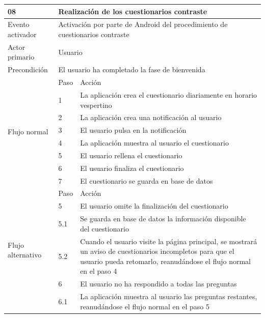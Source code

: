     \begin{table}[h]
        \centering
        \begin{tabularx}{\textwidth}{|l|l|X|}
            \hline
            08 & \multicolumn{2}{|X|}{Realización de los cuestionarios contraste} \\
            \hline
            Evento activador & \multicolumn{2}{|X|}{Activación por parte de Android del procedimiento de cuestionarios contraste} \\
            \hline
            Actor primario & \multicolumn{2}{|X|}{Usuario} \\
            \hline
            Precondición & \multicolumn{2}{|X|}{El usuario ha completado la fase de bienvenida} \\
            \hline
            \multirow{8}{*}{Flujo normal} & Paso & Acción \\
            \cline{2-3} & 1 & La aplicación crea el cuestionario diariamente en horario vespertino \\
            \cline{2-3} & 2 & La aplicación crea una notificación al usuario \\
            \cline{2-3} & 3 & El usuario pulsa en la notificación \\
            \cline{2-3} & 4 & La aplicación muestra al usuario el cuestionario \\
            \cline{2-3} & 5 & El usuario rellena el cuestionario \\
            \cline{2-3} & 6 & El usuario finaliza el cuestionario \\
            \cline{2-3} & 7 & El cuestionario se guarda en base de datos \\
            \hline
            \multirow{6}{*}{Flujo alternativo} & Paso & Acción \\
            \cline{2-3} & 5 & El usuario omite la finalización del cuestionario \\
            \cline{2-3} & 5.1 & Se guarda en base de datos la información disponible del cuestionario \\
            \cline{2-3} & 5.2 & Cuando el usuario visite la página principal, se mostrará un aviso de cuestionarios incompletos para que el usuario pueda retomarlo, reanudándose el flujo normal en el paso 4 \\
            \cline{2-3} & 6 & El usuario no ha respondido a todas las preguntas \\
            \cline{2-3} & 6.1 & La aplicación muestra al usuario las preguntas restantes, reanudándose el flujo normal en el paso 5 \\

\end{tabularx}
\end{table}

